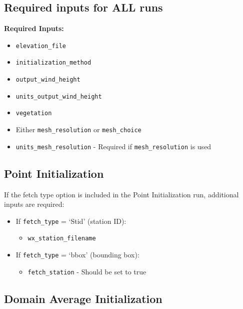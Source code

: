 \documentclass[12pt]{article}
\begin{document}
\subsection*{Required inputs for ALL runs}

\textbf{Required Inputs:}
\begin{itemize}
    \item \texttt{elevation\_file}
    \item \texttt{initialization\_method}
    \item \texttt{output\_wind\_height}
    \item \texttt{units\_output\_wind\_height}
    \item \texttt{vegetation}
    \item Either \texttt{mesh\_resolution} or \texttt{mesh\_choice}
    \item \texttt{units\_mesh\_resolution} - Required if \texttt{mesh\_resolution} is used
\end{itemize}

\subsection*{Point Initialization}
If the fetch type option is included in the Point Initialization run, additional inputs are required:

\begin{itemize}
    \item If \texttt{fetch\_type} = `Stid' (station ID):
        \begin{itemize}
            \item \texttt{wx\_station\_filename}
        \end{itemize}
                       
    \item If \texttt{fetch\_type} = `bbox' (bounding box):
        \begin{itemize}
            \item \texttt{fetch\_station} - Should be set to true
        \end{itemize}
\end{itemize}




\subsection*{Domain Average Initialization}
\end{document}
